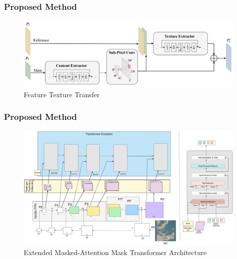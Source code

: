 \documentclass{beamer}
\begin{document}
\begin{frame}
  \frametitle{Proposed Method}
  \begin{figure}[h!]
    \centering
    \includegraphics[scale=0.15]{Figures/ftt.png}
    \caption{Feature Texture Transfer}
    \label{fig:ftt}
  \end{figure}
\end{frame}

\begin{frame}
  \frametitle{Proposed Method}
  \begin{figure}[h!]
    \centering
    \includegraphics[scale=0.033]{Figures/EMAMT.png}
    \caption{Extended Masked-Attention Mask Transformer Architecture}
    \label{fig:proposed-model}
  \end{figure}
\end{frame}
\end{document}
